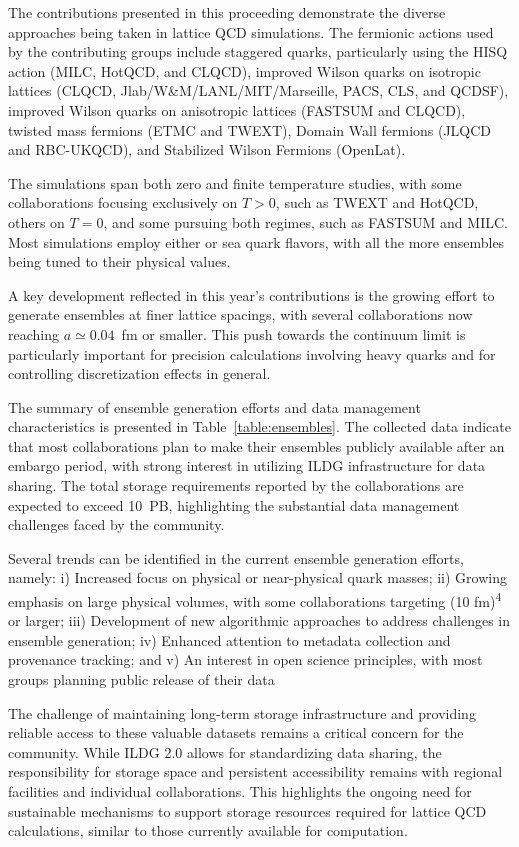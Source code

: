 \documentclass[a4paper,11pt]{article}
\begin{document}
The contributions presented in this proceeding demonstrate the diverse
approaches being taken in lattice QCD simulations. The fermionic
actions used by the contributing groups include staggered quarks,
particularly using the HISQ action (MILC, HotQCD, and CLQCD), improved
Wilson quarks on isotropic lattices (CLQCD,
Jlab/W\&M/LANL/MIT/Marseille, PACS, CLS, and QCDSF), improved Wilson
quarks on anisotropic lattices (FASTSUM and CLQCD), twisted mass
fermions (ETMC and TWEXT), Domain Wall fermions (JLQCD and RBC-UKQCD),
and Stabilized Wilson Fermions (OpenLat).

The simulations span both zero and finite temperature studies, with
some collaborations focusing exclusively on $T > 0$, such as TWEXT and
HotQCD, others on $T = 0$, and some pursuing both regimes, such as
FASTSUM and MILC. Most simulations employ either  or
 sea quark flavors, with all the more ensembles being
tuned to their physical values.

A key development reflected in this year's contributions is the
growing effort to generate ensembles at finer lattice spacings, with
several collaborations now reaching $a\simeq0.04$~fm or smaller. This
push towards the continuum limit is particularly important for
precision calculations involving heavy quarks and for controlling
discretization effects in general.

The summary of ensemble generation efforts and data management
characteristics is presented in Table~\ref{table:ensembles}. The
collected data indicate that most collaborations plan to make their
ensembles publicly available after an embargo period, with strong
interest in utilizing ILDG infrastructure for data sharing. The total
storage requirements reported by the collaborations are expected to
exceed 10~PB, highlighting the substantial data management challenges
faced by the community.

Several trends can be identified in the current ensemble generation
efforts, namely: i) Increased focus on physical or near-physical quark
masses; ii) Growing emphasis on large physical volumes, with some
collaborations targeting (10 fm)\textsuperscript{4} or larger; iii)
Development of new algorithmic approaches to address challenges in
ensemble generation; iv) Enhanced attention to metadata collection and
provenance tracking; and v) An interest in open science principles,
with most groups planning public release of their data

The challenge of maintaining long-term storage infrastructure and
providing reliable access to these valuable datasets remains a
critical concern for the community. While ILDG 2.0 allows for
standardizing data sharing, the responsibility for storage space and
persistent accessibility remains with regional facilities and
individual collaborations. This highlights the ongoing need for
sustainable mechanisms to support storage resources required for
lattice QCD calculations, similar to those currently available for
computation.
\end{document}

